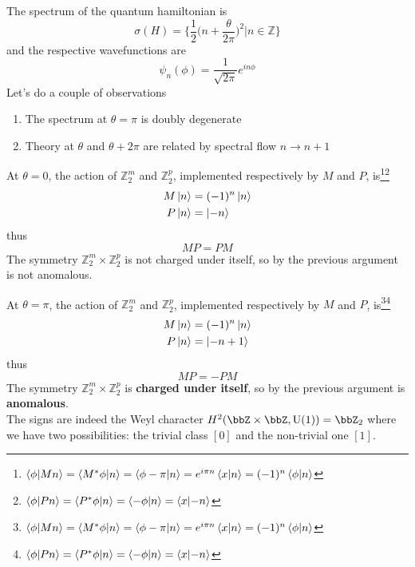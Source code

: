 \documentclass[11pt]{article}
\theoremstyle{definition}
\numberwithin{equation}{section}
\newcommand*\U{\mathrm{U}}
\begin{document}
 The spectrum of the quantum hamiltonian is
    \begin{equation}
     \sigma(H) = \bigg\{ \frac{1}{2} \bigg(n + \frac{\theta}{2 \pi}\bigg)^2 \bigg| n \in \mathbb{Z}\bigg\}
 \end{equation}
 and the respective wavefunctions are
\begin{equation}
    \psi_n(\phi) = \frac{1}{\sqrt{2\pi}} e^{i n \phi}
\end{equation}
Let's do a couple of observations
\begin{enumerate}
    \item The spectrum at $\theta = \pi$ is doubly degenerate
    \item Theory at $\theta$ and $\theta + 2\pi$ are related by spectral flow $n \to n+1$
\end{enumerate}
At $\theta=0$, the action of $\mathbb{Z}_2^m$ and $\mathbb{Z}_2^p$, implemented respectively by $M$ and $P$, is\footnote{$\braket{\phi}{M n} = \braket{M^* \phi}{n} = \braket{\phi - \pi}{n} = e^{i \pi n}\braket{x}{n} = (-1)^n \braket{\phi}{n}$}\footnote{$\braket{\phi}{P n} = \braket{P^* \phi}{n} = \braket{-\phi}{n} =  \braket{x}{-n}$}
\begin{equation}
    \begin{aligned}
        M \ket{n} &= (-1)^n \ket{n}\\
        P \ket{n} &= \ket{-n}
    \end{aligned}
\end{equation}
thus
\begin{equation}
      MP = PM
\end{equation}  
The symmetry $\mathbb{Z}_2^m \times \mathbb{Z}_2^p$ is not charged under itself, so by the previous argument is not anomalous.
 
At $\theta=\pi$, the action of $\mathbb{Z}_2^m$ and $\mathbb{Z}_2^p$, implemented respectively by $M$ and $P$, is\footnote{$\braket{\phi}{M n} = \braket{M^* \phi}{n} = \braket{\phi - \pi}{n} = e^{i \pi n}\braket{x}{n} = (-1)^n \braket{\phi}{n}$}\footnote{$\braket{\phi}{P n} = \braket{P^* \phi}{n} = \braket{-\phi}{n} =  \braket{x}{-n}$}
\begin{equation}
    \begin{aligned}
        M \ket{n} &= (-1)^n \ket{n}\\
        P \ket{n} &= \ket{-n+1}
    \end{aligned}
\end{equation}
thus
\begin{equation}
      MP = - PM
\end{equation}  
The symmetry $\mathbb{Z}_2^m \times \mathbb{Z}_2^p$ is \textbf{charged under itself}, so by the previous argument is \textbf{anomalous}.\\
The signs are indeed the Weyl character $H^{2}(\bbZ\times\bbZ,\U(1))=\bbZ_{2}$ where we have two possibilities: the trivial class $[0]$ and the non-trivial one $[1]$.
\end{document}

